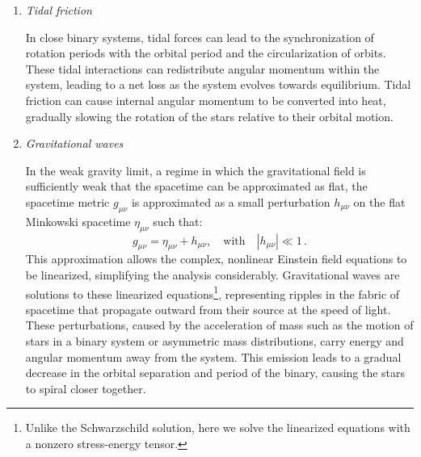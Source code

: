 \documentclass[main.tex]{subfiles}
\begin{document}
\begin{enumerate}
        \item \textit{Tidal friction}
        
        In close binary systems, tidal forces can lead to the synchronization of rotation periods with the orbital period and the circularization of orbits. These tidal interactions can redistribute angular momentum within the system, leading to a net loss as the system evolves towards equilibrium. Tidal friction can cause internal angular momentum to be converted into heat, gradually slowing the rotation of the stars relative to their orbital motion.

        \item \textit{Gravitational waves}

        In the weak gravity limit, a regime in which the gravitational field is sufficiently weak that the spacetime can be approximated as flat, the spacetime metric $g_{\mu \nu}$ is approximated as a small perturbation $h_{\mu \nu}$ on the flat Minkowski spacetime $\eta_{\mu \nu}$ such that:
        \begin{equation}\label{eq:weak_gravity_limit}
            g_{\mu \nu} = \eta_{\mu \nu} + h_{\mu \nu},\quad \text{with}\quad |h_{\mu \nu}| \ll 1\,.
        \end{equation}
        This approximation allows the complex, nonlinear Einstein field equations to be linearized, simplifying the analysis considerably. Gravitational waves are solutions to these linearized equations\footnote{Unlike the Schwarzschild solution, here we solve the linearized equations with a nonzero stress-energy tensor.}, representing ripples in the fabric of spacetime that propagate outward from their source at the speed of light. These perturbations, caused by the acceleration of mass such as the motion of stars in a binary system or asymmetric mass distributions, carry energy and angular momentum away from the system. This emission leads to a gradual decrease in the orbital separation and period of the binary, causing the stars to spiral closer together.
    \end{enumerate}



    
\end{document}
